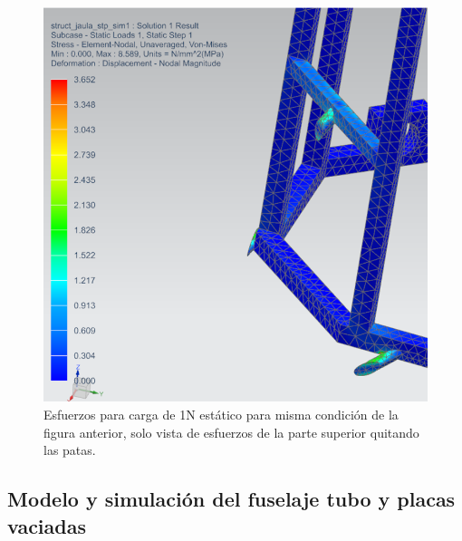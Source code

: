 \begin{figure}[htb]
    \centering
    \includegraphics[width=\linewidth]{fig/fea/jaula2.png}
    \caption{Esfuerzos para carga de 1N estático para misma condición de la figura anterior, solo vista de esfuerzos de la parte superior quitando las patas.}
    \label{fig:fea/jaula2}
\end{figure}

\null\newpage
\clearpage

\subsection{Modelo y simulación del fuselaje tubo y placas vaciadas}

